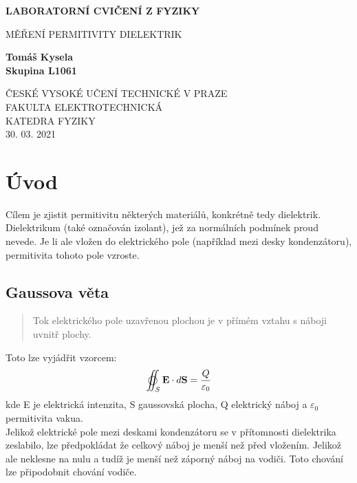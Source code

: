 \documentclass[titlepage]{article}
\begin{document}
    \begin{titlepage}
        \begin{center}
            \vspace*{1cm}
                
            \Large
            \textbf{LABORATORNÍ CVIČENÍ Z FYZIKY}
                
            \vspace{0.5cm}
            MĚŘENÍ PERMITIVITY DIELEKTRIK
                
            \vspace{1.5cm}
                
            \textbf{Tomáš Kysela}\\
            \textbf{Skupina L1061}
                
            \vfill
                
            \vspace{0.8cm}
            
            
            ČESKÉ VYSOKÉ UČENÍ TECHNICKÉ V PRAZE\\
            FAKULTA ELEKTROTECHNICKÁ\\
            KATEDRA FYZIKY\\
            30. 03. 2021
                
        \end{center}
    \end{titlepage}
    \tableofcontents
    \newpage
    \section{Úvod}
    		Cílem je zjistit permitivitu některých materiálů, konkrétně tedy dielektrik. \newline
    		Dielektrikum (také označován izolant), jež za normálních podmínek proud nevede. Je li ale vložen do elektrického pole (například mezi desky kondenzátoru), permitivita tohoto pole vzroste.
    		
    		\subsection{Gaussova věta}
    			\begin{quote}
    				Tok elektrického pole uzavřenou plochou je v přímém vztahu s náboji uvnitř plochy.
    			\end{quote}
    			Toto lze vyjádřit vzorcem:
    			\begin{equation} 
    				\varoiint_S \vb{E} \cdot d\vb{S} = \frac {Q}{\varepsilon_0}
    			\end{equation}
    			kde E je elektrická intenzita, S gaussovská plocha, Q elektrický náboj a $ \varepsilon_0 $ permitivita vakua.\\
    			Jelikož elektrické pole mezi deskami kondenzátoru se v přítomnosti dielektrika zeslabilo, lze předpokládat že celkový náboj je menší než před vložením. Jelikož ale neklesne na nulu a tudíž je menší než záporný náboj na vodiči. Toto chování lze připodobnit chování vodiče.
\end{document}
